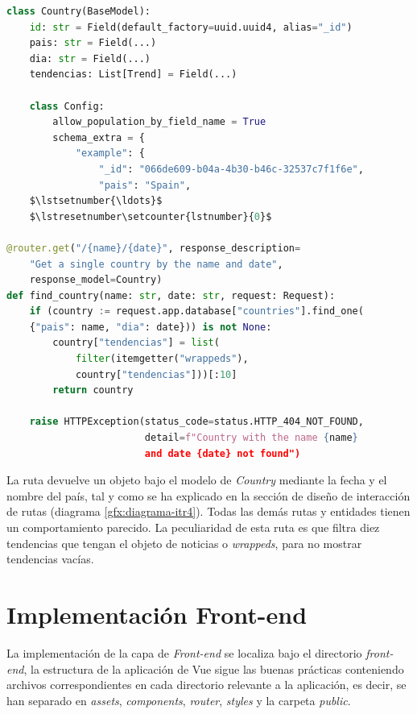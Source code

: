\vspace{0.3cm}

\begin{lstlisting}[caption=Modelo \textit{Country} y ejemplo de ruta,language=Python, mathescape=true]
class Country(BaseModel):
    id: str = Field(default_factory=uuid.uuid4, alias="_id")
    pais: str = Field(...)
    dia: str = Field(...)
    tendencias: List[Trend] = Field(...)

    class Config:
        allow_population_by_field_name = True
        schema_extra = {
            "example": {
                "_id": "066de609-b04a-4b30-b46c-32537c7f1f6e",
                "pais": "Spain",
    $\lstsetnumber{\ldots}$
    $\lstresetnumber\setcounter{lstnumber}{0}$

@router.get("/{name}/{date}", response_description=
    "Get a single country by the name and date",
    response_model=Country)
def find_country(name: str, date: str, request: Request):
    if (country := request.app.database["countries"].find_one(
    {"pais": name, "dia": date})) is not None:
        country["tendencias"] = list(
            filter(itemgetter("wrappeds"),
            country["tendencias"]))[:10]
        return country

    raise HTTPException(status_code=status.HTTP_404_NOT_FOUND,
                        detail=f"Country with the name {name} 
                        and date {date} not found")
\end{lstlisting}

La ruta devuelve un objeto bajo el modelo de \textit{Country} mediante la fecha y el nombre del país, tal y como se ha explicado en la sección de diseño de interacción de rutas (diagrama \ref{gfx:diagrama-itr4}). Todas las demás rutas y entidades tienen un comportamiento parecido. La peculiaridad de esta ruta es que filtra diez tendencias que tengan el objeto de noticias o \textit{wrappeds}, para no mostrar tendencias vacías.

\section{Implementación Front-end}
La implementación de la capa de \textit{Front-end} se localiza bajo el directorio \textit{front-end}, la estructura de la aplicación de Vue sigue las buenas prácticas conteniendo archivos correspondientes en cada directorio relevante a la aplicación, es decir, se han separado en \textit{assets}, \textit{components}, \textit{router}, \textit{styles} y la carpeta \textit{public}.

